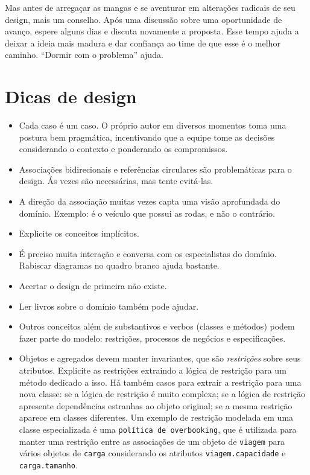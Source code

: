 \documentclass[a4paper, 12pt]{article}
\newcommand{\code}[1]{\texttt{#1}}
\begin{document}
Mas antes de arregaçar as mangas e se aventurar em alterações radicais de seu design, mais um conselho. Após uma discussão sobre uma oportunidade de avanço, espere alguns dias e discuta novamente a proposta. Esse tempo ajuda a deixar a ideia mais madura e dar confiança ao time de que esse é o melhor caminho. ``Dormir com o problema'' ajuda.


\section{Dicas de design}

\begin{itemize}

\item Cada caso é um caso. O próprio autor em diversos momentos toma uma postura bem pragmática, incentivando que a equipe tome as decisões considerando o contexto e ponderando os compromissos.

\item Associações bidirecionais e referências circulares são problemáticas para o design. Ás vezes são necessárias, mas tente evitá-las.

\item A direção da associação muitas vezes capta uma visão aprofundada do domínio. Exemplo: é o veículo que possui as rodas, e não o contrário.

\item Explicite os conceitos implícitos.

\item É preciso muita interação e conversa com os especialistas do domínio. Rabiscar diagramas no quadro branco ajuda bastante. 

\item Acertar o design de primeira não existe.

\item Ler livros sobre o domínio também pode ajudar.

\item Outros conceitos além de substantivos e verbos (classes e métodos) podem fazer parte do modelo: restrições, processos de negócios e especificações.

\item Objetos e agregados devem manter invariantes, que são \emph{restrições} sobre seus atributos. Explicite as restrições extraindo a lógica de restrição para um método dedicado a isso. Há também casos para extrair a restrição para uma nova classe: se a lógica de restrição é muito complexa; se a lógica de restrição apresente dependências estranhas ao objeto original; se a mesma restrição aparece em classes diferentes. Um exemplo de restrição modelada em uma classe especializada é uma \code{política de overbooking}, que é utilizada para manter uma restrição entre as associações de um objeto de \code{viagem} para vários objetos de \code{carga} considerando os atributos \code{viagem.capacidade} e \code{carga.tamanho}.


\end{itemize}
\end{document}
